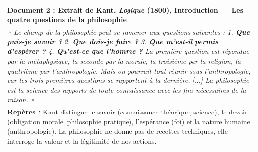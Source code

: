 \documentclass[11pt]{article}
\newcommand{\cle}[1]{{\popxbold\color{popdark}#1}}
\begin{document}
\vspace{0.5cm}
\begin{center}
\begin{tabularx}{\linewidth}{|X|}\hline
\rowcolor{poporangeL}
\textbf{Document 2 : Extrait de Kant, \emph{Logique} (1800), Introduction — Les quatre questions de la philosophie} \\
\emph{« Le champ de la philosophie peut se ramener aux questions suivantes : 1. \textbf{Que puis-je savoir ?} 2. \textbf{Que dois-je faire ?} 3. \textbf{Que m'est-il permis d'espérer ?} 4. \textbf{Qu'est-ce que l'homme ?} La première question est répondue par la métaphysique, la seconde par la morale, la troisième par la religion, la quatrième par l'anthropologie. Mais on pourrait tout réunir sous l'anthropologie, car les trois premières questions se rapportent à la dernière. [...] La philosophie est la science des rapports de toute connaissance avec les fins nécessaires de la raison. »} \\
\textbf{Repères :} Kant distingue le \cle{savoir} (connaissance théorique, science), le \cle{devoir} (obligation morale, philosophie pratique), l'\cle{espérance} (foi) et la \cle{nature humaine} (anthropologie). La philosophie ne donne pas de recettes techniques, elle interroge la \cle{valeur} et la \cle{légitimité} de nos actions. \\ \hline
\end{tabularx}
\end{center}
\end{document}
